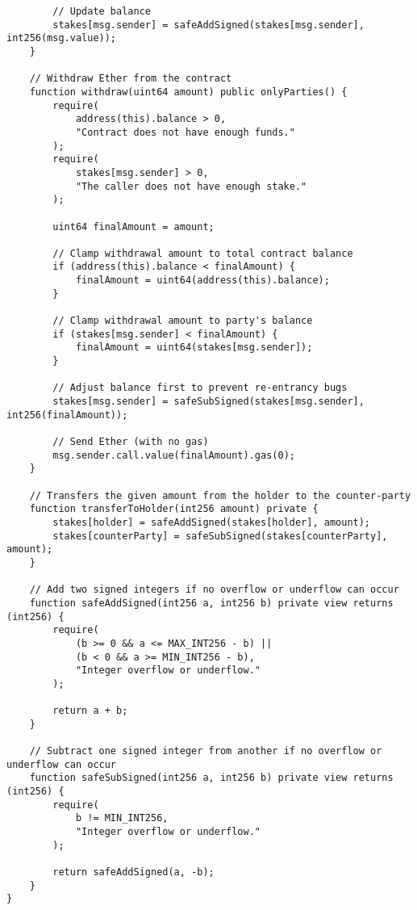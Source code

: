 \begin{lstlisting}
        // Update balance
        stakes[msg.sender] = safeAddSigned(stakes[msg.sender], int256(msg.value));
    }

    // Withdraw Ether from the contract
    function withdraw(uint64 amount) public onlyParties() {
        require(
            address(this).balance > 0,
            "Contract does not have enough funds."
        );
        require(
            stakes[msg.sender] > 0,
            "The caller does not have enough stake."
        );

        uint64 finalAmount = amount;

        // Clamp withdrawal amount to total contract balance
        if (address(this).balance < finalAmount) {
            finalAmount = uint64(address(this).balance);
        }

        // Clamp withdrawal amount to party's balance
        if (stakes[msg.sender] < finalAmount) {
            finalAmount = uint64(stakes[msg.sender]);
        }

        // Adjust balance first to prevent re-entrancy bugs
        stakes[msg.sender] = safeSubSigned(stakes[msg.sender], int256(finalAmount));

        // Send Ether (with no gas)
        msg.sender.call.value(finalAmount).gas(0);
    }

    // Transfers the given amount from the holder to the counter-party
    function transferToHolder(int256 amount) private {
        stakes[holder] = safeAddSigned(stakes[holder], amount);
        stakes[counterParty] = safeSubSigned(stakes[counterParty], amount);
    }

    // Add two signed integers if no overflow or underflow can occur
    function safeAddSigned(int256 a, int256 b) private view returns (int256) {
        require(
            (b >= 0 && a <= MAX_INT256 - b) ||
            (b < 0 && a >= MIN_INT256 - b),
            "Integer overflow or underflow."
        );

        return a + b;
    }

    // Subtract one signed integer from another if no overflow or underflow can occur
    function safeSubSigned(int256 a, int256 b) private view returns (int256) {
        require(
            b != MIN_INT256,
            "Integer overflow or underflow."
        );

        return safeAddSigned(a, -b);
    }
}
\end{lstlisting}
